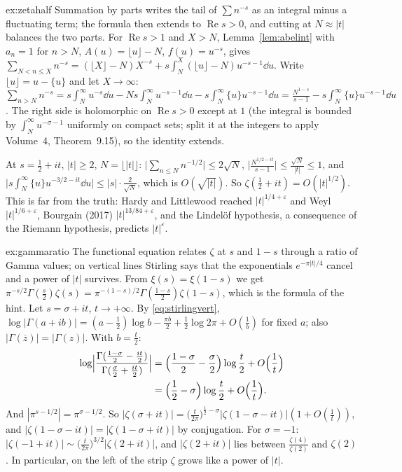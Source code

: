 \begin{solution}{ex:zetahalf}
\idea Summation by parts writes the tail of $\sum n^{-s}$ as an integral minus a fluctuating term; the formula then extends to $\operatorname{Re}s>0$, and cutting at $N\approx|t|$ balances the two parts.
\writeup For $\operatorname{Re}s>1$ and $X>N$, Lemma~\ref{lem:abelint} with $a_n=1$ for $n>N$, $A(u)=\lfloor u\rfloor-N$, $f(u)=u^{-s}$, gives
$\sum_{N<n\le X}n^{-s}=(\lfloor X\rfloor-N)X^{-s}+s\int_N^X(\lfloor u\rfloor-N)u^{-s-1}\dd u$. Write $\lfloor u\rfloor=u-\{u\}$ and let $X\to\infty$:
$\sum_{n>N}n^{-s}=s\int_N^\infty u^{-s}\dd u-Ns\int_N^\infty u^{-s-1}\dd u-s\int_N^\infty\{u\}u^{-s-1}\dd u=\frac{N^{1-s}}{s-1}-s\int_N^\infty\{u\}u^{-s-1}\dd u$. The right side is holomorphic on
$\operatorname{Re}s>0$ except at $1$ (the integral is bounded by $\int_N^\infty u^{-\sigma-1}$ uniformly on compact sets; split it at the integers to apply Volume~4, Theorem~9.15), so the identity extends.

At $s=\frac12+it$, $|t|\ge2$, $N=\lfloor|t|\rfloor$: $\bigl|\sum_{n\le N}n^{-1/2}\bigr|\le2\sqrt N$, $\bigl|\frac{N^{1/2-it}}{s-1}\bigr|\le\frac{\sqrt N}{|t|}\le1$, and $\bigl|s\int_N^\infty\{u\}u^{-3/2-it}\dd u\bigr|\le|s|\cdot\frac2{\sqrt N}$, which is $O(\sqrt{|t|})$.
So $\zeta(\frac12+it)=O(|t|^{1/2})$. This is far from the truth: Hardy and Littlewood reached $|t|^{1/4+\varepsilon}$ and Weyl $|t|^{1/6+\varepsilon}$, Bourgain (2017) $|t|^{13/84+\varepsilon}$, and the Lindelöf
hypothesis, a consequence of the Riemann hypothesis, predicts $|t|^\varepsilon$.
\end{solution}

\begin{solution}{ex:gammaratio}
\idea The functional equation relates $\zeta$ at $s$ and $1-s$ through a ratio of Gamma values; on vertical lines Stirling says that the exponentials $e^{-\pi|t|/4}$ cancel and a power of $|t|$
survives.
\writeup From $\xi(s)=\xi(1-s)$ we get $\pi^{-s/2}\Gamma(\frac s2)\zeta(s)=\pi^{-(1-s)/2}\Gamma(\frac{1-s}2)\zeta(1-s)$, which is the formula of the hint. Let $s=\sigma+it$, $t\to+\infty$. By \eqref{eq:stirlingvert},
$\log|\Gamma(a+ib)|=(a-\frac12)\log b-\frac{\pi b}2+\frac12\log2\pi+O(\frac1b)$ for fixed $a$; also $|\Gamma(\overline z)|=|\Gamma(z)|$. With $b=\frac t2$:
\[
\begin{aligned}\log\Bigl|\frac{\Gamma(\frac{1-\sigma}2-\frac{it}2)}{\Gamma(\frac\sigma2+\frac{it}2)}\Bigr|&=\Bigl(\frac{1-\sigma}2-\frac\sigma2\Bigr)\log\frac t2+O\Bigl(\frac1t\Bigr)\\&=\Bigl(\frac12-\sigma\Bigr)\log\frac t2+O\Bigl(\frac1t\Bigr).\end{aligned}
\]
And $|\pi^{s-1/2}|=\pi^{\sigma-1/2}$. So $|\zeta(\sigma+it)|=\bigl(\frac t{2\pi}\bigr)^{\frac12-\sigma}|\zeta(1-\sigma-it)|(1+O(\frac1t))$, and $|\zeta(1-\sigma-it)|=|\zeta(1-\sigma+it)|$ by conjugation. For $\sigma=-1$:
$|\zeta(-1+it)|\sim\bigl(\frac t{2\pi}\bigr)^{3/2}|\zeta(2+it)|$, and $|\zeta(2+it)|$ lies between $\frac{\zeta(4)}{\zeta(2)}$ and $\zeta(2)$. In particular, on the left of the strip $\zeta$ grows like a power of $|t|$.
\end{solution}

